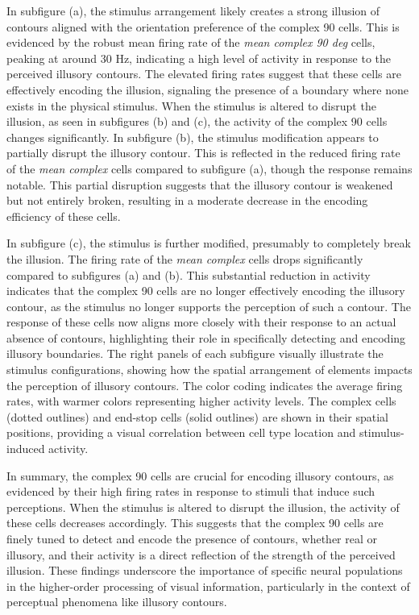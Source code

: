 \documentclass[12pt]{article}
\begin{document}
In subfigure (a), the stimulus arrangement likely creates a strong illusion of contours aligned with the orientation preference of the complex 90 cells. This is evidenced by the robust mean firing rate of the \textit{mean complex 90 deg} cells, peaking at around 30 Hz, indicating a high level of activity in response to the perceived illusory contours. The elevated firing rates suggest that these cells are effectively encoding the illusion, signaling the presence of a boundary where none exists in the physical stimulus. When the stimulus is altered to disrupt the illusion, as seen in subfigures (b) and (c), the activity of the complex 90 cells changes significantly. In subfigure (b), the stimulus modification appears to partially disrupt the illusory contour. This is reflected in the reduced firing rate of the \textit{mean complex} cells compared to subfigure (a), though the response remains notable. This partial disruption suggests that the illusory contour is weakened but not entirely broken, resulting in a moderate decrease in the encoding efficiency of these cells.

In subfigure (c), the stimulus is further modified, presumably to completely break the illusion. The firing rate of the \textit{mean complex} cells drops significantly compared to subfigures (a) and (b). This substantial reduction in activity indicates that the complex 90 cells are no longer effectively encoding the illusory contour, as the stimulus no longer supports the perception of such a contour. The response of these cells now aligns more closely with their response to an actual absence of contours, highlighting their role in specifically detecting and encoding illusory boundaries. The right panels of each subfigure visually illustrate the stimulus configurations, showing how the spatial arrangement of elements impacts the perception of illusory contours. The color coding indicates the average firing rates, with warmer colors representing higher activity levels. The complex cells (dotted outlines) and end-stop cells (solid outlines) are shown in their spatial positions, providing a visual correlation between cell type location and stimulus-induced activity.

In summary, the complex 90 cells are crucial for encoding illusory contours, as evidenced by their high firing rates in response to stimuli that induce such perceptions. When the stimulus is altered to disrupt the illusion, the activity of these cells decreases accordingly. This suggests that the complex 90 cells are finely tuned to detect and encode the presence of contours, whether real or illusory, and their activity is a direct reflection of the strength of the perceived illusion. These findings underscore the importance of specific neural populations in the higher-order processing of visual information, particularly in the context of perceptual phenomena like illusory contours.
\end{document}
